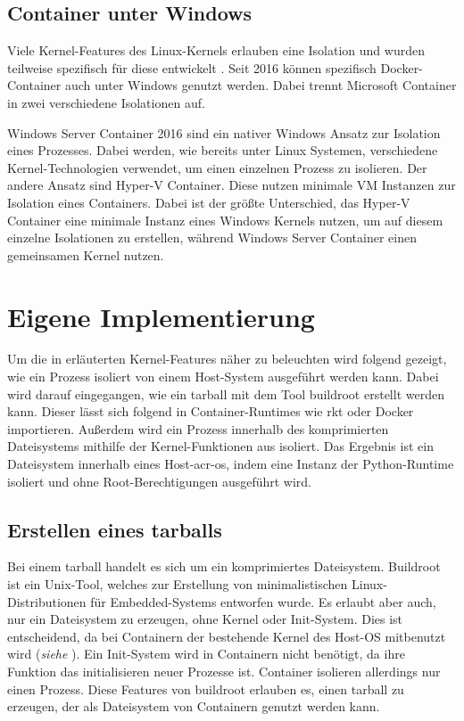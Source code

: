 \subsection{Container unter Windows}
\label{sec:windows}
Viele Kernel-Features des Linux-Kernels erlauben eine Isolation und wurden teilweise spezifisch für diese entwickelt \citep{Namespaces7LinuxManualPage}. Seit 2016 können spezifisch Docker-Container auch unter Windows genutzt werden. Dabei trennt Microsoft Container in zwei verschiedene Isolationen auf.

Windows Server Container 2016 sind ein nativer Windows Ansatz zur Isolation eines Prozesses. Dabei werden, wie bereits unter Linux Systemen, verschiedene Kernel-Technologien verwendet, um einen einzelnen Prozess zu isolieren. Der andere Ansatz sind Hyper-V Container. Diese nutzen minimale VM Instanzen zur Isolation eines Containers. Dabei ist der größte Unterschied, das Hyper-V Container eine minimale Instanz eines Windows Kernels nutzen, um auf diesem einzelne Isolationen zu erstellen, während Windows Server Container einen gemeinsamen Kernel nutzen.

\section{Eigene Implementierung}
\label{sec:eigeneImpl}
Um die in  erläuterten Kernel-Features näher zu beleuchten wird folgend gezeigt, wie ein Prozess isoliert von einem Host-System ausgeführt werden kann. Dabei wird darauf eingegangen, wie ein tarball mit dem Tool buildroot erstellt werden kann. Dieser lässt sich folgend in Container-Runtimes wie rkt oder Docker importieren. Außerdem wird ein Prozess innerhalb des komprimierten Dateisystems mithilfe der Kernel-Funktionen aus  isoliert. Das Ergebnis ist ein Dateisystem innerhalb eines Host-\gls{acr-os}, indem  eine Instanz der Python-Runtime isoliert und ohne Root-Berechtigungen ausgeführt wird.

\subsection{Erstellen eines tarballs}
\label{sec:tarball}
Bei einem tarball handelt es sich um ein komprimiertes Dateisystem. Buildroot ist ein Unix-Tool, welches zur Erstellung von minimalistischen Linux-Distributionen für Embedded-Systems entworfen wurde. Es erlaubt aber auch, nur ein Dateisystem zu erzeugen, ohne Kernel oder Init-System. Dies ist entscheidend, da bei Containern der bestehende Kernel des Host-OS mitbenutzt wird (\textit{siehe }). Ein Init-System wird in Containern nicht benötigt, da ihre Funktion das initialisieren neuer Prozesse ist. Container isolieren allerdings nur einen Prozess. Diese Features von buildroot erlauben es, einen tarball zu erzeugen, der als Dateisystem von Containern genutzt werden kann.


